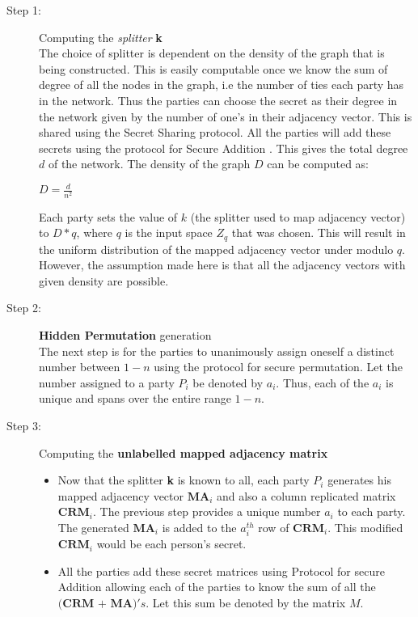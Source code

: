 \documentclass{llncs}
\begin{document}
\begin{description}
 \item[Step 1:]\hspace{2mm} Computing the \textit{splitter} \textbf{k} \\
The choice of splitter is dependent on the density of the graph that is being constructed. This is easily computable once we know the sum of degree of all the nodes in the graph, i.e the number of ties each party has in the network. Thus the parties can choose the secret as their degree in the network given by the number of one's in their adjacency vector. This is shared using the Secret Sharing protocol. All the parties will add these secrets using the protocol for Secure Addition . This gives the total degree $d$ of the network. The density of the graph $D$ can be computed as: 
\begin{center}
$D=\frac{d}{n^2}$
\end{center}
Each party sets the value of $k$ (the splitter used to map adjacency vector) to $D*q$, where $q$ is the input space $Z_q$ that was chosen. This will result in the uniform distribution of the mapped adjacency vector under modulo $q$. However, the assumption made here is that all the adjacency vectors with given density are possible.   

\item[Step 2:]\hspace{2mm} \textbf{Hidden Permutation} generation\\
The next step is for the parties to unanimously assign oneself a distinct number between $1-n$ using the protocol for secure permutation. Let the number assigned to a party $P_i$ be denoted by $a_i$. Thus, each of the $a_i$ is unique and spans over the entire range $1-n$. 

\item[Step 3:]\hspace{2mm} Computing the \textbf{unlabelled mapped adjacency matrix}
\begin{itemize}

\item Now that the splitter \textbf{k} is known to all, each party $P_i$ generates his mapped adjacency vector	$\textbf{MA}_i$ and also a column replicated matrix $\textbf{CRM}_i$. The previous step provides a unique number $a_i$ to each party. The generated $\textbf{MA}_i$ is added to the $a_i^{th}$ row of $\textbf{CRM}_i$. This modified $\textbf{CRM}_i$ would be each person’s secret.

\item All the parties add these secret matrices using Protocol for secure Addition allowing each of the parties to know the sum of all the $\textbf{(CRM + MA)}'s$. Let this sum be denoted by the matrix $M$.


\end{itemize}
\end{description}
\end{document}
